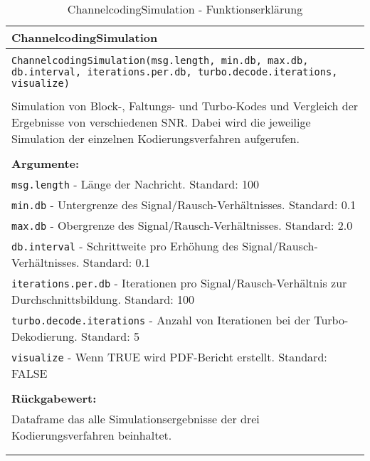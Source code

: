 \begin{longtable}{|p{\textwidth}|}
\hline
\rowcolor{lightblue}ChannelcodingSimulation\\
\hline
\\
\texttt{ChannelcodingSimulation(msg.length, min.db, max.db, db.interval, iterations.per.db, turbo.decode.iterations, visualize)}\\
\\
Simulation von Block-, Faltungs- und Turbo-Kodes und Vergleich der Ergebnisse von verschiedenen SNR. Dabei wird die jeweilige Simulation der einzelnen Kodierungsverfahren aufgerufen.\\
\\
\textbf{Argumente:}\\
\texttt{msg.length} - Länge der Nachricht. Standard: 100\\
\texttt{min.db} - Untergrenze des Signal/Rausch-Verhältnisses. Standard: 0.1\\
\texttt{max.db} - Obergrenze des Signal/Rausch-Verhältnisses. Standard: 2.0\\
\texttt{db.interval} - Schrittweite pro Erhöhung des Signal/Rausch-Verhältnisses. Standard: 0.1\\
\texttt{iterations.per.db} - Iterationen pro Signal/Rausch-Verhältnis zur Durchschnittsbildung. Standard: 100\\
\texttt{turbo.decode.iterations} - Anzahl von Iterationen bei der Turbo-Dekodierung. Standard: 5\\
\texttt{visualize} - Wenn TRUE wird PDF-Bericht erstellt. Standard: FALSE\\
\\
\textbf{Rückgabewert:}\\
Dataframe das alle Simulationsergebnisse der drei Kodierungsverfahren beinhaltet.\\
\\
\hline
\caption{ChannelcodingSimulation - Funktionserklärung}
\end{longtable}